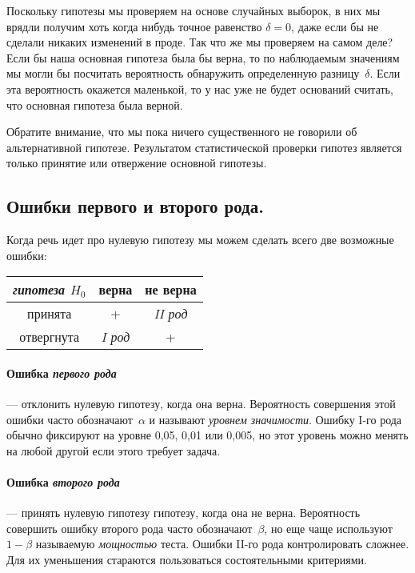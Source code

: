 \documentclass[../handbook.tex]{subfiles}
\begin{document}
Поскольку гипотезы мы проверяем на основе случайных выборок, в них мы врядли
получим хоть когда нибудь точное равенство $\delta = 0$, даже если бы не
сделали никаких изменений в проде. Так что же мы проверяем на самом деле? Если
бы наша основная гипотеза была бы верна, то по наблюдаемым значениям мы могли
бы посчитать вероятность обнаружить определенную разницу~$\delta$. Если эта
вероятность окажется маленькой, то у нас уже не будет оснований считать, что
основная гипотеза была верной.

Обратите внимание, что мы пока ничего существенного не говорили об
альтернативной гипотезе. Результатом статистической проверки гипотез является
только принятие или отвержение основной гипотезы.

\subsection{Ошибки первого и второго рода.} 
Когда речь идет про нулевую гипотезу мы можем сделать всего две возможные
ошибки:
\begin{margintable}
    \label{tab:mistakes}
    \begin{center}
        \begin{tabular}[c]{c|c c}
            {\it гипотеза $H_0$} & верна & не верна \\
            \hline
            принята & + & {\it II род} \\
            отвергнута & {\it I род} & + \\
        \end{tabular}
    \end{center}
\end{margintable}
        
\paragraph{Ошибка \emph{первого рода}} --- отклонить нулевую гипотезу, когда
она верна. Вероятность совершения этой ошибки часто обозначают~$\alpha$ и
называют \emph{уровнем значимости}. Ошибку I-го рода обычно фиксируют на уровне
0,05, 0,01 или 0,005, но этот уровень можно менять на любой другой если этого
требует задача.

\paragraph{Ошибка \emph{второго рода}}
--- принять нулевую гипотезу гипотезу,
когда она не верна. Вероятность совершить ошибку второго рода часто
обозначают~$\beta$, но еще чаще используют $1 - \beta$ называемую
\emph{мощностью} теста. Ошибки II-го рода контролировать сложнее. Для их
уменьшения стараются пользоваться состоятельными критериями.
\end{document}
